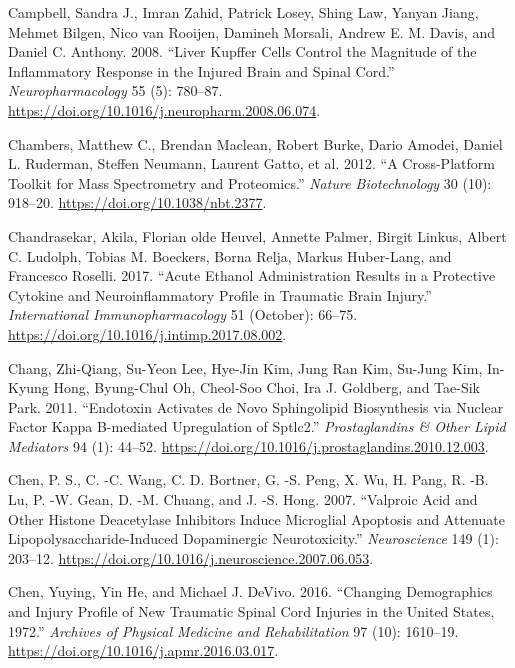 \documentclass[9pt,lineno]{elife}
\newlength{\cslhangindent}
\newlength{\cslentryspacingunit} %
\newenvironment{CSLReferences}[2] %
 {%
  \setlength{\parindent}{0pt}
  \ifodd #1
  \let\oldpar\par
  \def\par{\hangindent=\cslhangindent\oldpar}
  \fi
  \setlength{\parskip}{#2\cslentryspacingunit}
 }%
 {}
\begin{document}
\begin{CSLReferences}{1}{0}
\leavevmode{}%
Campbell, Sandra J., Imran Zahid, Patrick Losey, Shing Law, Yanyan Jiang, Mehmet Bilgen, Nico van Rooijen, Damineh Morsali, Andrew E. M. Davis, and Daniel C. Anthony. 2008. {``Liver {Kupffer} Cells Control the Magnitude of the Inflammatory Response in the Injured Brain and Spinal Cord.''} \emph{Neuropharmacology} 55 (5): 780--87. \url{https://doi.org/10.1016/j.neuropharm.2008.06.074}.

\leavevmode{}%
Chambers, Matthew C., Brendan Maclean, Robert Burke, Dario Amodei, Daniel L. Ruderman, Steffen Neumann, Laurent Gatto, et al. 2012. {``A Cross-Platform Toolkit for Mass Spectrometry and Proteomics.''} \emph{Nature Biotechnology} 30 (10): 918--20. \url{https://doi.org/10.1038/nbt.2377}.

\leavevmode{}%
Chandrasekar, Akila, Florian olde Heuvel, Annette Palmer, Birgit Linkus, Albert C. Ludolph, Tobias M. Boeckers, Borna Relja, Markus Huber-Lang, and Francesco Roselli. 2017. {``Acute Ethanol Administration Results in a Protective Cytokine and Neuroinflammatory Profile in Traumatic Brain Injury.''} \emph{International Immunopharmacology} 51 (October): 66--75. \url{https://doi.org/10.1016/j.intimp.2017.08.002}.

\leavevmode{}%
Chang, Zhi-Qiang, Su-Yeon Lee, Hye-Jin Kim, Jung Ran Kim, Su-Jung Kim, In-Kyung Hong, Byung-Chul Oh, Cheol-Soo Choi, Ira J. Goldberg, and Tae-Sik Park. 2011. {``Endotoxin Activates de Novo Sphingolipid Biosynthesis via Nuclear Factor Kappa {B-mediated} Upregulation of {Sptlc2}.''} \emph{Prostaglandins \& Other Lipid Mediators} 94 (1): 44--52. \url{https://doi.org/10.1016/j.prostaglandins.2010.12.003}.

\leavevmode{}%
Chen, P. S., C. -C. Wang, C. D. Bortner, G. -S. Peng, X. Wu, H. Pang, R. -B. Lu, P. -W. Gean, D. -M. Chuang, and J. -S. Hong. 2007. {``Valproic Acid and Other Histone Deacetylase Inhibitors Induce Microglial Apoptosis and Attenuate Lipopolysaccharide-Induced Dopaminergic Neurotoxicity.''} \emph{Neuroscience} 149 (1): 203--12. \url{https://doi.org/10.1016/j.neuroscience.2007.06.053}.

\leavevmode{}%
Chen, Yuying, Yin He, and Michael J. DeVivo. 2016. {``Changing {Demographics} and {Injury Profile} of {New Traumatic Spinal Cord Injuries} in the {United States}, 1972.''} \emph{Archives of Physical Medicine and Rehabilitation} 97 (10): 1610--19. \url{https://doi.org/10.1016/j.apmr.2016.03.017}.


\end{CSLReferences}
\end{document}
